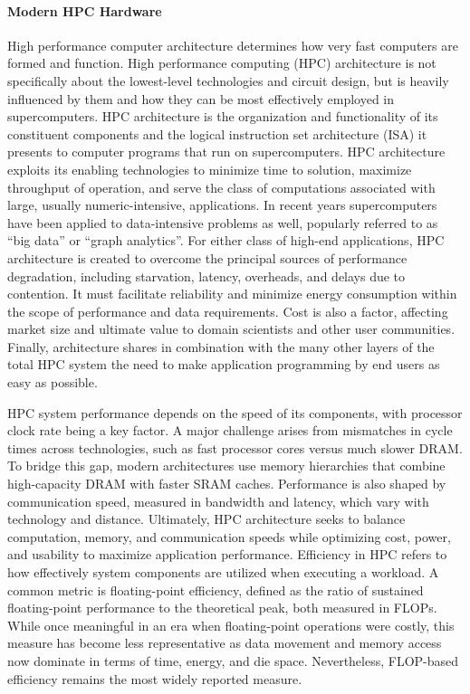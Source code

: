 \paragraph{Modern HPC Hardware}
\label{sec:background_hpc_hardware}
High performance computer architecture determines how very fast computers are formed and function. High performance computing (HPC) architecture is not specifically about the lowest-level technologies and circuit design, but is heavily influenced by them and how they can be most effectively employed in supercomputers. HPC architecture is the organization and functionality of its constituent components and the logical instruction set architecture (ISA) it presents to computer programs that run on supercomputers. HPC architecture exploits its enabling technologies to minimize time to solution, maximize throughput of operation, and serve the class of computations associated with large, usually numeric-intensive, applications. In recent years supercomputers have been applied to data-intensive problems as well, popularly referred to as “big data” or “graph analytics”. For either class of high-end applications, HPC architecture is created to overcome the principal sources of performance degradation, including starvation, latency, overheads, and delays due to contention. It must facilitate reliability and minimize energy consumption within the scope of performance and data requirements. Cost is also a factor, affecting market size and ultimate value to domain scientists and other user communities. Finally, architecture shares in combination with the many other layers of the total HPC system the need to make application programming by end users as easy as possible.

HPC system performance depends on the speed of its components, with processor clock rate being a key factor. A major challenge arises from mismatches in cycle times across technologies, such as fast processor cores versus much slower DRAM. To bridge this gap, modern architectures use memory hierarchies that combine high-capacity DRAM with faster SRAM caches. Performance is also shaped by communication speed, measured in bandwidth and latency, which vary with technology and distance. Ultimately, HPC architecture seeks to balance computation, memory, and communication speeds while optimizing cost, power, and usability to maximize application performance.
Efficiency in HPC refers to how effectively system components are utilized when executing a workload. A common metric is floating-point efficiency, defined as the ratio of sustained floating-point performance to the theoretical peak, both measured in FLOPs. While once meaningful in an era when floating-point operations were costly, this measure has become less representative as data movement and memory access now dominate in terms of time, energy, and die space. Nevertheless, FLOP-based efficiency remains the most widely reported measure.

